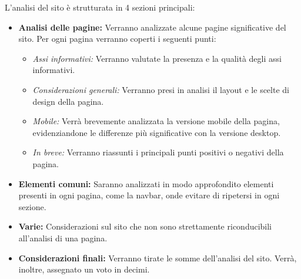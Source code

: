 L'analisi del sito è strutturata in 4 sezioni principali:
\begin{itemize}
	\item \textbf{Analisi delle pagine:} Verranno analizzate alcune pagine significative del sito. Per ogni pagina verranno coperti i seguenti punti:
	\begin{itemize}
	 	\item \textit{Assi informativi:} Verranno valutate la presenza e la qualità degli assi informativi.
	 	\item \textit{Considerazioni generali:} Verranno presi in analisi il layout e le scelte di design della pagina.
	 	\item \textit{Mobile:} Verrà brevemente analizzata la versione mobile della pagina, evidenziandone le differenze più significative con la versione desktop.
	 	\item \textit{In breve:} Verranno riassunti i principali punti positivi o negativi della pagina.
	 \end{itemize} 
	 \item \textbf{Elementi comuni:} Saranno analizzati in modo approfondito elementi presenti in ogni pagina, come la navbar, onde evitare di ripetersi in ogni sezione.
	 \item \textbf{Varie:} Considerazioni sul sito che non sono strettamente riconducibili all'analisi di una pagina.
	 \item \textbf{Considerazioni finali:} Verranno tirate le somme dell'analisi del sito. Verrà, inoltre, assegnato un voto in decimi.
\end{itemize}